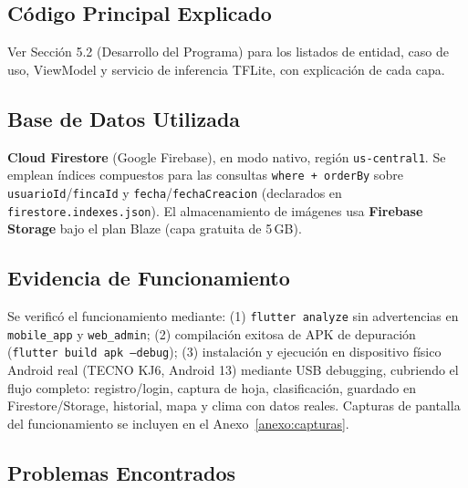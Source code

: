 \documentclass[12pt,a4paper]{article}
\begin{document}
\subsection{Código Principal Explicado}

Ver Sección 5.2 (Desarrollo del Programa) para los listados de entidad, caso de
uso, ViewModel y servicio de inferencia TFLite, con explicación de cada capa.

\subsection{Base de Datos Utilizada}

\textbf{Cloud Firestore} (Google Firebase), en modo nativo, región
\texttt{us-central1}. Se emplean índices compuestos para las consultas
\texttt{where + orderBy} sobre \texttt{usuarioId}/\texttt{fincaId} y
\texttt{fecha}/\texttt{fechaCreacion} (declarados en
\texttt{firestore.indexes.json}). El almacenamiento de imágenes usa
\textbf{Firebase Storage} bajo el plan Blaze (capa gratuita de 5\,GB).

\subsection{Evidencia de Funcionamiento}

Se verificó el funcionamiento mediante: (1) \texttt{flutter analyze} sin
advertencias en \texttt{mobile\_app} y \texttt{web\_admin}; (2) compilación
exitosa de APK de depuración (\texttt{flutter build apk --debug}); (3)
instalación y ejecución en dispositivo físico Android real (TECNO KJ6,
Android 13) mediante USB debugging, cubriendo el flujo completo:
registro/login, captura de hoja, clasificación, guardado en Firestore/Storage,
historial, mapa y clima con datos reales. Capturas de pantalla del
funcionamiento se incluyen en el Anexo~\ref{anexo:capturas}.

\subsection{Problemas Encontrados}
\end{document}
